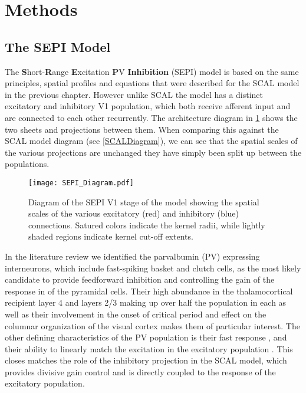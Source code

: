\section{Methods}

\subsection{The SEPI Model}

The \textbf{S}hort-\textbf{R}ange \textbf{E}xcitation \textbf{P}V
\textbf{Inhibition} (SEPI) model is based on the same principles,
spatial profiles and equations that were described for the SCAL model
in the previous chapter. However unlike SCAL the model has a distinct
excitatory and inhibitory V1 population, which both receive afferent
input and are connected to each other recurrently. The architecture
diagram in \ref{SEPIDiagram} shows the two sheets and projections
between them. When comparing this against the SCAL model diagram (see
\ref{SCALDiagram}), we can see that the spatial scales of the various
projections are unchanged they have simply been split up between the
populations.

\begin{figure}
	\centering
        \texttt{[image: SEPI\_Diagram.pdf]}
	\caption{Diagram of the SEPI V1 stage of the model showing the
          spatial scales of the various excitatory (red) and
          inhibitory (blue) connections. Satured colors indicate the
          kernel radii, while lightly shaded regions indicate kernel
          cut-off extents.}
	\label{SEPIDiagram}
\end{figure}

In the literature review we identified the parvalbumin (PV) expressing
interneurons, which include fast-spiking basket and clutch cells, as
the most likely candidate to provide feedforward inhibition and
controlling the gain of the response in of the pyramidal cells. Their
high abundance in the thalamocortical recipient layer 4 and layers 2/3
making up over half the population in each \citep{VanBrederode1990} as
well as their involvement in the onset of critical period
\citep{Fagiolini2000} and effect on the columnar organization of the
visual cortex \citep{Hensch2004} makes them of particular interest. The
other defining characteristics of the PV population is their fast
response \citep{Cruikshank2007,Gabernet2005}, and their ability to
linearly match the excitation in the excitatory population
\citep{Atallah2012}. This closes matches the role of the inhibitory
projection in the SCAL model, which provides divisive gain control and
is directly coupled to the response of the excitatory population.


